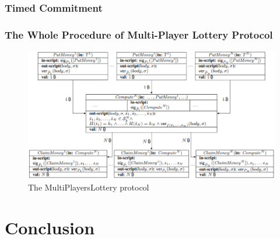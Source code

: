 \documentclass{beamer}
\begin{document}
\begin{frame}\frametitle{Timed Commitment} 

\end{frame}



\begin{frame}\frametitle{The Whole Procedure of Multi-Player Lottery Protocol} 
\begin{figure}
	\includegraphics[width=4.6 in]{myfigs/lotteryprotocol1.jpg}
	\caption{The MultiPlayersLottery protocol}
\end{figure}
\end{frame}


\section[conclu]{Conclusion}


\begin{frame}\frametitle{}
\Huge
\begin{center}
\end{center}
\end{frame}

\end{document}
